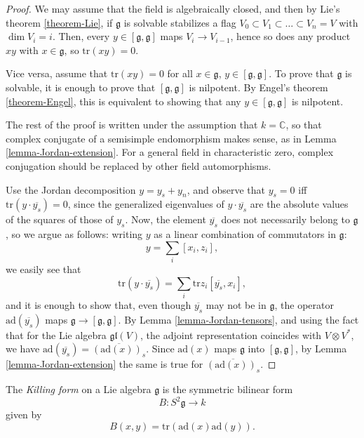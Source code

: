 \begin{proof}
We may assume that the field is algebraically closed, and then by Lie's theorem \ref{theorem-Lie}, if $\mathfrak g$ is solvable stabilizes a flag $V_0\subset V_1\subset \dots \subset V_n=V$ with $\dim V_i=i$. Then, every $y\in [\mathfrak g,\mathfrak g]$ maps $V_i \to V_{i-1}$, hence so does any product $xy$ with $x\in \mathfrak g$, so $\text{tr}(xy)=0$.

Vice versa, assume that $\text{tr}(xy)=0$ for all $x\in \mathfrak g$, $y\in [\mathfrak g, \mathfrak g]$. To prove that $\mathfrak g$ is solvable, it is enough to prove that $[\mathfrak g,\mathfrak g]$ is nilpotent. By Engel's theorem \ref{theorem-Engel}, this is equivalent to showing that any $y\in [\mathfrak g,\mathfrak g]$ is nilpotent. 

The rest of the proof is written under the assumption that $k=\mathbb C$, so that complex conjugate of a semisimple endomorphism makes sense, as in Lemma \ref{lemma-Jordan-extension}. For a general field in characteristic zero, complex conjugation should be replaced by other field automorphisms. 

Use the Jordan decomposition $y=y_s + y_n$, and observe that $y_s=0$ iff $\text{tr}(y\cdot \overline{y_s})=0$, since the generalized eigenvalues of $y \cdot \overline{y_s}$ are the absolute values of the squares of those of $y_s$. Now, the element $\overline{y_s}$ does not necessarily belong to $\mathfrak g$, so we argue as follows: writing $y$ as a linear combination of commutators in $\mathfrak g$:
$$ y = \sum_i [x_i, z_i],$$
we easily see that 
$$ \text{tr} (y \cdot \overline{y_s}) = \sum_i \text{tr} z_i [\overline{y_s}, x_i],$$
and it is enough to show that, even though $\overline{y_s}$ may not be in $\mathfrak g$, the operator $\text{ad}(\overline{y_s})$ maps $\mathfrak g\to [\mathfrak g,\mathfrak g]$. By Lemma \ref{lemma-Jordan-tensors}, and using the fact that for the Lie algebra $\mathfrak{gl}(V)$, the adjoint representation coincides with $V\otimes V^*$, we have $\text{ad}(\overline{y_s}) = \overline{(\text{ad}(x))_s}$. Since $\text{ad}(x)$ maps $\mathfrak g$ into $[\mathfrak g,\mathfrak g]$, by Lemma \ref{lemma-Jordan-extension} the same is true for $\overline{(\text{ad}(x))_s}$.




\end{proof}

\begin{definition}
\label{definition-Killing-form}
The {\it Killing form} on a Lie algebra $\mathfrak g$ is the symmetric bilinear form 
$$B:S^2 \mathfrak g\to k$$
given by 
$$ B(x,y) = \text{tr}(\text{ad}(x)\text{ad}(y)).$$
\end{definition}

